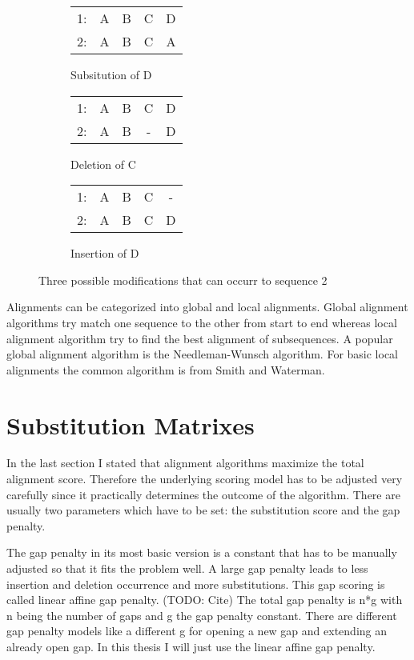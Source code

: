 \begin{figure}[h]
	\centering
	\begin{subfigure}[b]{0.3\textwidth}
	\begin{tabular}{c|cccc}
		1: &A&B&C&D\\
		2: &A&B&C&A\\
	\end{tabular}
	\caption{Subsitution of D} 
	\end{subfigure}
	\begin{subfigure}[b]{0.3\textwidth}
	\begin{tabular}{c|cccc}
		1:&A&B&C&D\\
		2:&A&B&-&D\\
	\end{tabular}
	\caption{Deletion of C} 
	\end{subfigure}
	\begin{subfigure}[b]{0.3\textwidth}
	\begin{tabular}{c|cccc}
		1:&A&B&C&-\\
		2:&A&B&C&D\\
	\end{tabular}
	\caption{Insertion of D}
	\end{subfigure}
	\label{fig:alignmentbasic}
	\caption{Three possible modifications that can occurr to sequence 2}
\end{figure}

Alignments can be categorized into global and local alignments. Global alignment algorithms try match one sequence to the other from start to end whereas local alignment algorithm try to find the best alignment of subsequences. 
A popular global alignment algorithm is the Needleman-Wunsch algorithm\cite{needleman1970}. For basic local alignments the common algorithm is from Smith and Waterman\cite{waterman1981}.

\section{Substitution Matrixes}
\label{sec:foundationsubstitutionmatrix}
In the last section I stated that alignment algorithms maximize the total alignment score. Therefore the underlying scoring model has to be adjusted very carefully since it practically determines the outcome of the algorithm.
There are usually two parameters which have to be set: the substitution score and the gap penalty. 

The gap penalty in its most basic version is a constant that has to be manually adjusted so that it fits the problem well. 
A large gap penalty leads to less insertion and deletion occurrence and more substitutions.
This gap scoring is called linear affine gap penalty. (TODO: Cite)
The total gap penalty is n*g with n being the number of gaps and g the gap penalty constant. 
There are different gap penalty models like a different g for opening a new gap and extending an already open gap. 
In this thesis I will just use the linear affine gap penalty. 

